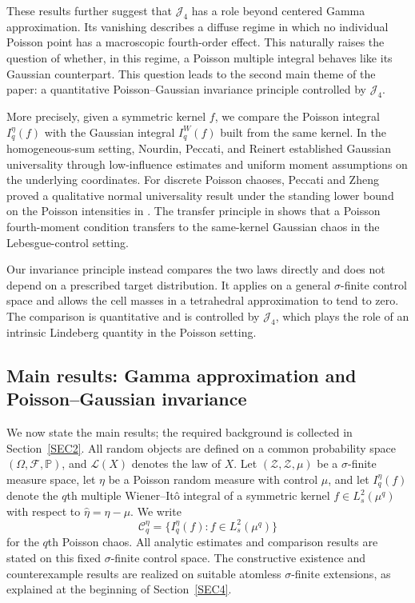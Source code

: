 \documentclass[letterpaper,11pt,reqno]{amsart}
\numberwithin{equation}{section}
\theoremstyle{plain}
\theoremstyle{definition}
\theoremstyle{remark}
\newcommand{\PP}{\mathbb{P}}
\newcommand{\cC}{\mathcal{C}}
\newcommand{\cF}{\mathcal{F}}
\newcommand{\cL}{\mathcal{L}}
\newcommand{\cZ}{\mathcal{Z}}
\newcommand{\sZ}{\mathscr{Z}}
\newcommand{\Jfour}{\mathcal J_4}
\newcommand{\s}{\sigma}
\begin{document}
These results further suggest that $\Jfour$ has a role beyond
centered Gamma approximation.  Its vanishing describes a diffuse
regime in which no individual Poisson point has a macroscopic
fourth-order effect.  This naturally raises the question of whether,
in this regime, a Poisson multiple integral behaves like its Gaussian
counterpart.  This question leads to the second main theme of the
paper: a quantitative Poisson--Gaussian invariance principle
controlled by $\Jfour$.

More precisely, given a symmetric kernel $f$, we compare the Poisson
integral $I_q^\eta(f)$ with the Gaussian integral $I_q^W(f)$ built
from the same kernel.  In the homogeneous-sum setting, Nourdin,
Peccati, and Reinert \cite[Theorems~1.2 and~4.1]{NPR10} established
Gaussian universality through low-influence estimates and uniform
moment assumptions on the underlying coordinates.  For discrete
Poisson chaoses, Peccati and Zheng \cite[Theorem~3.4]{PZ14} proved a
qualitative normal universality result under the standing lower bound
on the Poisson intensities in
\cite[Theorem~3.2 and Remark~3.3]{PZ14}.  The transfer principle in
\cite[Proposition~1.5]{DVZ18} shows that a Poisson fourth-moment
condition transfers to the same-kernel Gaussian chaos in the
Lebesgue-control setting.

Our invariance principle instead compares the two laws directly and
does not depend on a prescribed target distribution.  It applies on a
general $\s$-finite control space and allows the cell masses in a
tetrahedral approximation to tend to zero.  The comparison is
quantitative and is controlled by $\Jfour$, which plays the role of
an intrinsic Lindeberg quantity in the Poisson setting.


\subsection{Main results: Gamma approximation and Poisson--Gaussian invariance}
\label{SEC_12}

We now state the main results; the required background is collected
in Section~\ref{SEC2}.  All random objects are defined on a common
probability space $(\Omega,\cF,\PP)$, and $\cL(X)$ denotes the law of
$X$.  Let $(\cZ,\sZ,\mu)$ be a $\s$-finite measure space, let $\eta$ be
a Poisson random measure with control $\mu$, and let $I_q^\eta(f)$
denote the $q$th multiple Wiener--It\^o integral of a symmetric kernel
$f\in L_s^2(\mu^q)$ with respect to $\widehat\eta=\eta-\mu$.
We write
\[
\cC_q^\eta=\{I_q^\eta(f):f\in L_s^2(\mu^q)\}
\]
for the $q$th Poisson chaos.
All analytic estimates and comparison results are stated on this fixed
$\s$-finite control space.  The constructive existence and counterexample
results are realized on suitable atomless $\s$-finite extensions, as
explained at the beginning of Section~\ref{SEC4}.
\end{document}

